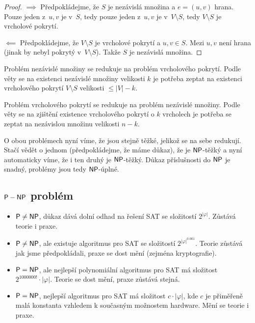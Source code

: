 \begin{proof}
$\implies$ Předpokládejme, že $S$ je nezávislá množina
a $e = (u,v)$ hrana. Pouze jeden z~$u,v$ je v~$S$,
tedy pouze jeden z~$u,v$ je v~$V \setminus S$, tedy $V \setminus S$ je
vrcholové pokrytí.

$\impliedby$ Předpokládejme, že $V \setminus S$ je vrcholové pokrytí
a $u, v \in S$. Mezi $u,v$ není hrana (jinak by nebyl pokrytý
v~$V \setminus S$). Takže $S$ je nezávislá množina.
\end{proof}

Problém nezávislé množiny se redukuje na problém vrcholového pokrytí.
Podle věty se na existenci nezávislé množiny velikosti $k$
je potřeba zeptat na existenci vrcholového pokrytí
$V \setminus S$ velikosti $ \leq \lvert V \rvert - k$.

Problém vrcholového pokrytí se redukuje na problém nezávislé množiny.
Podle věty se na zjištění existence vrcholového pokrytí o $k$ vrcholech
je potřeba se zeptat na nezávislou množinu velikosti $n-k$.

O obou problémech nyní víme, že jsou stejně těžké, jelikož se na sebe
redukují. Stačí vědět o jednom (předpokládejme, že máme důkaz), že je
${\mathsf{NP}}$-těžký a nyní automaticky víme, že i ten druhý je ${\mathsf{NP}}$-těžký.
Důkaz příslušnosti do ${\mathsf{NP}}$ je snadný, problémy jsou tedy ${\mathsf{NP}}$-úplné.

\subsection{${\mathsf{P}}-{\mathsf{NP}}$ problém}

\begin{itemize}
\item ${\mathsf{P}} \neq {\ensuremath{\mathsf{NP}}}$, důkaz dává dolní odhad na řešení SAT se složitostí
    $2^{\lvert\varphi\rvert}$.
    Zůstává teorie i praxe.

\item ${\mathsf{P}} \neq {\ensuremath{\mathsf{NP}}}$, ale existuje algoritmus pro SAT se složitostí
    $2^{\lvert\varphi\rvert^{0.001}}$.
    Teorie zůstává jak jsme předpokládali, praxe se
    dost mění (zejména kryptografie).

\item ${\mathsf{P}} = {\mathsf{NP}}$, ale nejlepší polynomiální algoritmus pro SAT má
    složitost $2^{1000000!} \cdot \lvert \varphi \rvert$.  Teorie se
    dost mění, praxe zůstává stejná.

\item ${\mathsf{P}} = {\mathsf{NP}}$, nejlepší algoritmus pro SAT má složitost
    $c \cdot \lvert \varphi \rvert$, kde $c$ je přiměřeně malá konstanta
    vzhledem k současným možnostem hardware.
    Mění se teorie i praxe.
\end{itemize}

